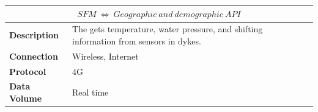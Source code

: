 \begin{table}[!htbp]
	\centering
    \begin{tabular}{L{} L{}}
    \toprule
     \\ \midrule
    \textbf{Description} & The \ProjectName{} gets temperature, water pressure, and shifting information from sensors in dykes. \\
    \textbf{Connection} & Wireless, Internet \\
    \textbf{Protocol} & 4G \\
    \textbf{Data Volume} & Real time \\
    \bottomrule
    \end{tabular}
\end{table}

